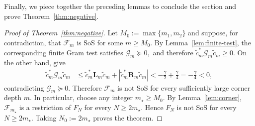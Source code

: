 

Finally, we piece together the preceding lemmas to conclude the section and prove Theorem~\ref{thm:negative}.

\begin{proof}[Proof of Theorem~\ref{thm:negative}]
Let
$
M_0:=\max\{m_1,m_2\}
$
and suppose, for contradiction, that $\mathcal F_m$ is SoS for some
$m\ge M_0$.  By Lemma~\ref{lem:finite-test}, the corresponding finite
Gram test satisfies
$
\mathcal G_m\succeq0,
$
and therefore
$
        \widetilde c_m^*\mathcal G_m\widetilde c_m\ge0.
$
On the other hand,  give
\[
\begin{aligned}
\widetilde c_m^*\mathcal G_m\widetilde c_m
&\le
\widetilde c_m^*\mathbf L_m\widetilde c_m
+
\left|
\widetilde c_m^*\mathbf R_m\widetilde c_m
\right| <
-\frac{\gamma}{2}+\frac{\gamma}{4}
=
-\frac{\gamma}{4}<0,
\end{aligned}
\]
contradicting $\mathcal G_m\succeq0$. Therefore $\mathcal F_m$ is not SoS for every sufficiently large corner
depth $m$.  In particular, choose any integer $m_\star\ge M_0$.
By Lemma~\ref{lem:corner}, $\mathcal F_{m_\star}$ is a restriction of
$F_N$ for every $N\ge2m_\star$.  Hence $F_N$ is not SoS for every
$N\ge2m_\star$.  Taking
$
N_0:=2m_\star
$
proves the theorem.
\end{proof}
